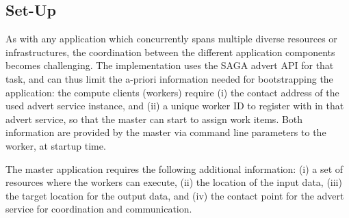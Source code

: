 \documentclass[3p,twocolumn]{elsarticle}
\begin{document}
  

\subsection{\sagamapreduce Set-Up}

As with any application which concurrently spans multiple diverse
resources or infrastructures, the coordination between the different
application components becomes challenging.  The \smr implementation
uses the SAGA advert API for that task, and can thus limit the a-priori
information needed for bootstrapping the application: the compute
clients (workers) require (i) the contact address of the used advert
service instance, and (ii) a unique worker ID to register with in that
advert service, so that the master can start to assign work items.
Both information are provided by the master via command line
parameters to the worker, at startup time.

The master application requires the following additional information:
(i) a set of resources where the workers can execute, (ii) the
location of the input data, (iii) the target location for the output
data, and (iv) the contact point for the advert service for
coordination and communication.  
\end{document}
